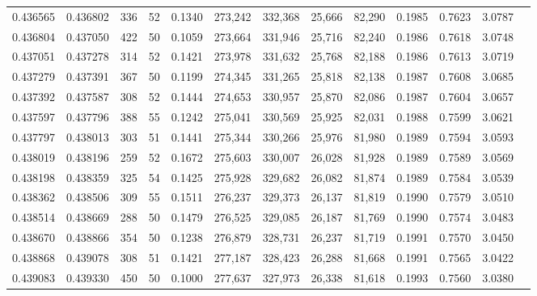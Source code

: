 \begin{tabular}{rrrrrrrrrrrrr}
0.436565 & 0.436802 &   336 &  52 &                                     0.1340 & 273,242 & 332,368 &  25,666 &  82,290 & 0.1985 & 0.7623 & 3.0787 \\
0.436804 & 0.437050 &   422 &  50 &                                     0.1059 & 273,664 & 331,946 &  25,716 &  82,240 & 0.1986 & 0.7618 & 3.0748 \\
0.437051 & 0.437278 &   314 &  52 &                                     0.1421 & 273,978 & 331,632 &  25,768 &  82,188 & 0.1986 & 0.7613 & 3.0719 \\
0.437279 & 0.437391 &   367 &  50 &                                     0.1199 & 274,345 & 331,265 &  25,818 &  82,138 & 0.1987 & 0.7608 & 3.0685 \\
0.437392 & 0.437587 &   308 &  52 &                                     0.1444 & 274,653 & 330,957 &  25,870 &  82,086 & 0.1987 & 0.7604 & 3.0657 \\
0.437597 & 0.437796 &   388 &  55 &                                     0.1242 & 275,041 & 330,569 &  25,925 &  82,031 & 0.1988 & 0.7599 & 3.0621 \\
0.437797 & 0.438013 &   303 &  51 &                                     0.1441 & 275,344 & 330,266 &  25,976 &  81,980 & 0.1989 & 0.7594 & 3.0593 \\
0.438019 & 0.438196 &   259 &  52 &                                     0.1672 & 275,603 & 330,007 &  26,028 &  81,928 & 0.1989 & 0.7589 & 3.0569 \\
0.438198 & 0.438359 &   325 &  54 &                                     0.1425 & 275,928 & 329,682 &  26,082 &  81,874 & 0.1989 & 0.7584 & 3.0539 \\
0.438362 & 0.438506 &   309 &  55 &                                     0.1511 & 276,237 & 329,373 &  26,137 &  81,819 & 0.1990 & 0.7579 & 3.0510 \\
0.438514 & 0.438669 &   288 &  50 &                                     0.1479 & 276,525 & 329,085 &  26,187 &  81,769 & 0.1990 & 0.7574 & 3.0483 \\
0.438670 & 0.438866 &   354 &  50 &                                     0.1238 & 276,879 & 328,731 &  26,237 &  81,719 & 0.1991 & 0.7570 & 3.0450 \\
0.438868 & 0.439078 &   308 &  51 &                                     0.1421 & 277,187 & 328,423 &  26,288 &  81,668 & 0.1991 & 0.7565 & 3.0422 \\
0.439083 & 0.439330 &   450 &  50 &                                     0.1000 & 277,637 & 327,973 &  26,338 &  81,618 & 0.1993 & 0.7560 & 3.0380 \\

\end{tabular}
